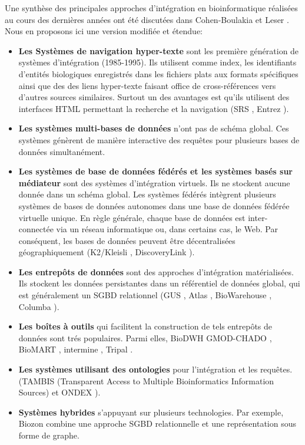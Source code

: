 Une synthèse des principales approches d'intégration en bioinformatique réalisées au cours des dernières années ont été discutées dans Cohen-Boulakia et Leser \cite{cohen2010}. Nous en proposons ici une version modifiée et étendue:
\begin{itemize}
 
 \item \textbf{Les Systèmes de navigation hyper-texte} sont les première génération de systèmes d'intégration (1985-1995). Ils utilisent comme index, les identifiants d'entités biologiques enregistrés dans les fichiers plats aux formats spécifiques ainsi que des des liens hyper-texte faisant office de cross-références vers d'autres sources similaires. Surtout un des avantages est qu'ils utilisent des interfaces HTML permettant la recherche et la navigation (SRS \cite{srs}, Entrez \cite{entrez}). 
 \item \textbf{Les systèmes multi-bases de données} n'ont pas de schéma global. Ces systèmes génèrent de manière interactive des requêtes pour plusieurs bases de données simultanément. 
 \item \textbf{Les systèmes de base de données fédérés et les systèmes basés sur médiateur} sont des systèmes d'intégration virtuels. Ils ne stockent aucune donnée dans un schéma global. Les systèmes fédérés intègrent plusieurs systèmes de bases de données autonomes dans une base de données fédérée virtuelle unique. En règle générale, chaque base de données est inter-connectée via un réseau informatique ou, dans certains cas, le Web. Par conséquent, les bases de données peuvent être décentralisées géographiquement (K2/Kleisli \cite{k2kleisli}, DiscoveryLink \cite{discoverylink}).
 \item \textbf{Les entrepôts de données} sont des approches d'intégration matérialisées. Ils stockent les données persistantes dans un référentiel de données global, qui est généralement un SGBD relationnel (GUS \cite{k2kleisli}, Atlas \cite{atlas}, BioWarehouse \cite{biowarehouse}, Columba \cite{columba}).
\item \textbf{Les boîtes à outils} qui facilitent la construction de tels entrepôts de données sont trés populaires. Parmi elles, BioDWH \cite{biodwh} GMOD-CHADO \cite{chado_2006}, BioMART \cite{biomart2009}, intermine \cite{intermine_2012}, Tripal \cite{tripal_2011,tripal_2013,tripal_2018}.
 \item \textbf{Les systèmes utilisant des ontologies} pour l'intégration et les requêtes. (TAMBIS (Transparent Access to Multiple Bioinformatics Information Sources) \cite{tambis} et ONDEX \cite{ondex_2006,ondex_2011,Taubert2014}).
 \item \textbf{Systèmes hybrides} s'appuyant sur plusieurs technologies. Par exemple, Biozon \cite{biozon2006} combine une approche SGBD relationnelle et une représentation sous forme de graphe.\\
  
\end{itemize}

